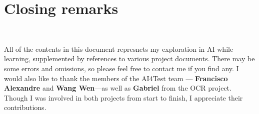 \section{Closing remarks}\

All of the contents in this document represnets my exploration in AI while learning, supplemented by references to various project documents. There may be some errors and omissions, so please feel free to contact me if you find any. I would also like to thank the members of the AI4Test team — \textbf{Francisco Alexandre} and \textbf{Wang Wen}—as well as\textbf{ Gabriel} from the OCR project. Though I was involved in both projects from start to finish, I appreciate their contributions.